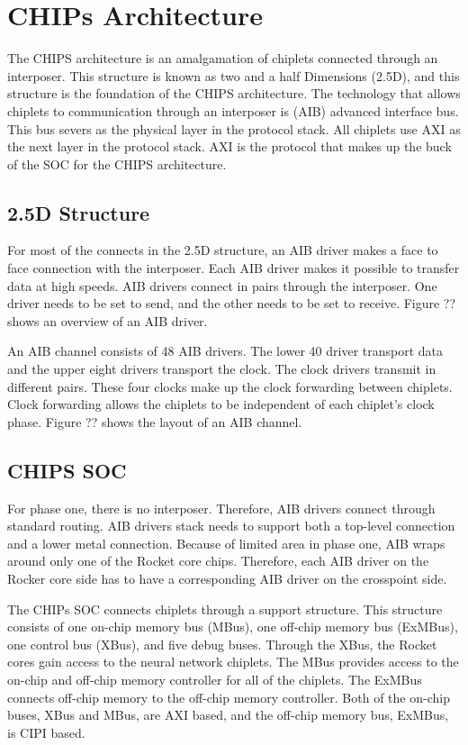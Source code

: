 \documentclass[../main.tex]{subfiles}
\begin{document}
\section{CHIPs Architecture}
The CHIPS architecture is an amalgamation of chiplets connected through an interposer. This structure is known as two and a half Dimensions (2.5D), and this structure is the foundation of the CHIPS architecture. The technology that allows chiplets to communication through an interposer is (AIB) advanced interface bus\cite{AIBWhitePaper}. This bus severs as the physical layer in the protocol stack. All chiplets use AXI as the next layer in the protocol stack. AXI is the protocol that makes up the buck of the SOC for the CHIPS architecture.

\subsection{2.5D Structure}
For most of the connects in the 2.5D structure, an AIB driver makes a face to face connection with the interposer. Each AIB driver makes it possible to transfer data at high speeds. AIB drivers connect in pairs through the interposer. One driver needs to be set to send, and the other needs to be set to receive. Figure ?? shows an overview of an AIB driver. 

An AIB channel consists of 48 AIB drivers.  The lower 40 driver transport data and the upper eight drivers transport the clock. The clock drivers transmit in different pairs. These four clocks make up the clock forwarding between chiplets. Clock forwarding allows the chiplets to be independent of each chiplet's clock phase. Figure ?? shows the layout of an AIB channel.

\subsection{CHIPS SOC}
For phase one, there is no interposer. Therefore, AIB drivers connect through standard routing. AIB drivers stack needs to support both a top-level connection and a lower metal connection.  Because of limited area in phase one, AIB wraps around only one of the Rocket core chips. Therefore, each AIB driver on the Rocker core side has to have a corresponding AIB driver on the crosspoint side.

The CHIPs SOC connects chiplets through a support structure. This structure consists of one on-chip memory bus (MBus), one off-chip memory bus (ExMBus), one control bus (XBus), and five debug buses.  Through the XBus, the Rocket cores gain access to the neural network chiplets. The MBus provides access to the on-chip and off-chip memory controller for all of the chiplets. The ExMBus connects off-chip memory to the off-chip memory controller.  Both of the on-chip buses, XBus and MBus, are AXI based, and the off-chip memory bus, ExMBus, is CIPI based. 
\end{document}

